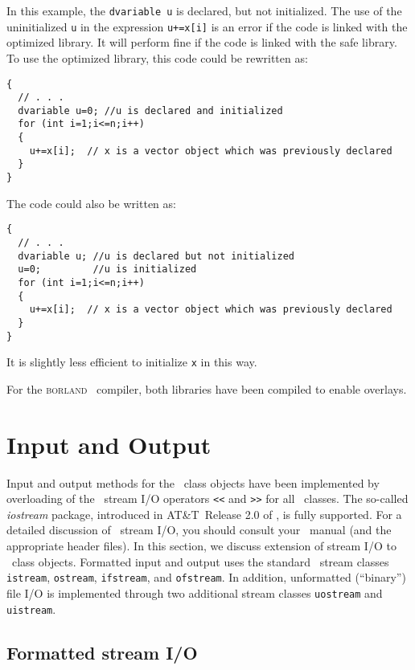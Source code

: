 \documentclass{admbmanual}
\begin{document}
In this example, the \texttt{dvariable u} is declared, but not initialized.
The use of the uninitialized \texttt{u} in the expression \texttt{u+=x[i]}
is an error if the code is linked with the optimized library.
It will perform fine if the code is linked with the safe library.
To use the optimized library, this code could be rewritten as:
\begin{lstlisting}
{
  // . . .
  dvariable u=0; //u is declared and initialized
  for (int i=1;i<=n;i++)
  {
    u+=x[i];  // x is a vector object which was previously declared
  }
}
\end{lstlisting}
The code could also be written as:
\begin{lstlisting}
{
  // . . .
  dvariable u; //u is declared but not initialized
  u=0;         //u is initialized
  for (int i=1;i<=n;i++)
  {
    u+=x[i];  // x is a vector object which was previously declared
  }
}
\end{lstlisting}
It is slightly less efficient to initialize \texttt{x} in this way. 

For the \textsc{borland} \cplus\ compiler, both libraries have been 
compiled to enable overlays.






\chapter{Input and Output}

Input and output methods for the \scAD\ class objects  
have been implemented by
overloading of the \cplus\ stream I/O operators \texttt{<{}<}
and \texttt{>{}>} for all \scAD\ classes.
The so-called \textit{iostream} package, introduced in 
AT\&T~Release 2.0 of \cplus, is fully supported. 
For a detailed discussion of \cplus\ stream I/O, you should
consult your \cplus\ manual (and the appropriate header files).
In this section, we
discuss extension of stream I/O to \scAD\ class objects. 
Formatted input and output uses the standard \cplus\ stream classes 
\texttt{istream}, \texttt{ostream}, \texttt{ifstream}, and \texttt{ofstream}. 
In addition, unformatted (``binary'') file I/O is implemented
through two additional stream classes \texttt{uostream} and \texttt{uistream}.


\section{Formatted stream I/O}
\end{document}
